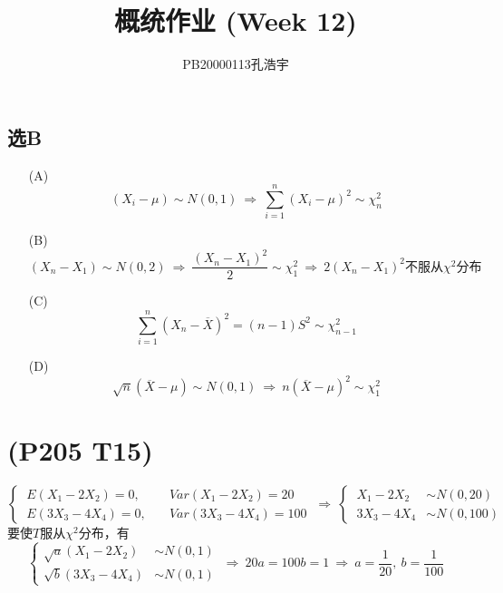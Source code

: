 \documentclass{article}
\title{概统作业 (Week 12)}
\author{PB20000113孔浩宇}
\begin{document}
\maketitle
\section{}  %
\subsection*{选B}
\begin{enumerate}
    \item [(A)]
    \[
        (X_i - \mu) \sim N(0,1)
        \ \Rightarrow\ 
        \sum\limits_{i=1}^{n} {(X_i - \mu)}^2 \sim \chi _{n}^{2}
    \]
    \item [(B)]
    \[
        (X_n - X_1) \sim N(0,2)
        \ \Rightarrow\ 
        \frac{{(X_n - X_1)}^2}{2} \sim \chi_{1}^{2}
        \ \Rightarrow\ 
        2 {(X_n - X_1)}^2 \mbox{不服从} \chi^2 \mbox{分布}
    \]
    \item [(C)]
    \[
        \sum\limits_{i=1}^{n} {(X_n - \overline{X})}^2
        = (n-1) S^2 \sim \chi_{n-1}^{2}
    \]
    \item [(D)]
    \[
        \sqrt{n} (\overline{X} - \mu) \sim N(0,1)
        \ \Rightarrow\ 
        n {(\overline{X} - \mu)}^2 \sim \chi_{1}^{2}    
    \]
\end{enumerate}

\section{(P205 T15)}  %
\[
    \begin{cases}
        \ E(X_1 - 2 X_2) = 0, \quad & Var(X_1 - 2 X_2) = 20\\
        \ E(3 X_3 - 4 X_4) = 0, \quad & Var(3 X_3 - 4 X_4) = 100
    \end{cases}
    \ \Rightarrow\ 
    \begin{cases}
        \ X_1 - 2 X_2 & \sim N(0, 20)\\
        \ 3 X_3 - 4X_4 & \sim N(0, 100)
    \end{cases}
\]
要使$T$服从$\chi^2$分布，有
\[
    \begin{cases}
        \sqrt{a} (X_1 - 2 X_2)  & \sim N(0, 1)\\
        \sqrt{b} (3X_3 - 4X_4)  & \sim N(0, 1)
    \end{cases}
    \ \Rightarrow\ 
    20a = 100b = 1
    \ \Rightarrow\ 
    a = \frac{1}{20},\ b =\frac{1}{100}
\]
\end{document}
